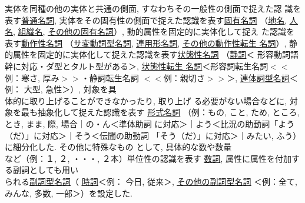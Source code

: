 実体を同種の他の実体と共通の側面, すなわちその一般性の側面で捉えた認
識を表す\underline{普通名詞}, 
実体をその固有性の側面で捉えた認識を表す\underline{固有名詞}
（\underline{\underline{地名}}, \underline{\underline{人名}}, 
\underline{\underline{組織名}}, \underline{\underline{その他の固有名詞}}）,
 動的属性を固定的に実体化して捉え
た認識を表す\underline{動作性名詞}
（\underline{\underline{サ変動詞型名詞}}, 
\underline{\underline{連用形名詞}}, \underline{\underline{その他の動作性転生
名詞}}）, 静的属性を固定的に実体化して捉えた認識を表す\underline{状態性名詞}
（\underline{\underline{静詞}}＜
形容動詞語幹に対応・ダ型とタルト型がある＞, \underline{\underline{状態性転生
名詞}}＜形容詞転生名詞\( << \)例\hspace*{-0.15mm}：\hspace*{-0.2mm}寒さ, 厚み\(>>\)・静詞転生名詞
\( << \)例\hspace*{-0.1mm}：\hspace*{-0.2mm}親切さ\(>>\)＞, \hspace*{-0.2mm}\underline{\underline{連体詞型名詞}}\hspace*{-0.1mm}＜例\hspace*{-0.15mm}：\hspace*{-0.3mm}
大型, 急性＞）, 対象を具\\体的に取り上げることができなかったり, 取り上げ
る必要がない場合などに, 対象を最も抽象化して捉えた認識を表す
\hspace*{-0.2mm}\underline{形式名詞}\hspace*{-0.2mm}
（例\hspace*{-0.2mm}：\hspace*{-0.2mm}もの, こと, ため, ところ, とき, まま, 際, 場合｜の・ん＜準体助詞
に対応＞｜よう＜比況の助動詞「よう（だ）」に対応＞｜そう＜伝聞の助動詞
「そう（だ）」に対応＞｜みたい, ふう）に細分化した. その他に特殊なもの
として, 具体的な数や数量\\など\hspace*{-0.2mm}（例\hspace*{-0.2mm}：\hspace*{-0.2mm}１, ２, ・\hspace{-.5em}・\hspace{-.5em}・, ２本）\hspace*{-0.2mm}単位性の認識を表す
\underline{数詞}, 
属性に属性を付加する副詞としても用い\\られる\underline{副詞型名詞}（
\underline{\underline{時詞}}＜例：
今日, 従来＞, \underline{\underline{その他の副詞型名詞}}
＜例：全て, みんな, 多数, 一部＞）を設定した. 

